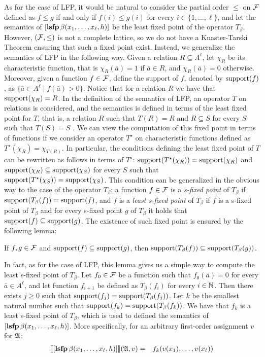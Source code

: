 As for the case of LFP, it would be natural to consider the partial order $\leq$ on $\F$ defined as $f \leq g$ if and only if $f(i) \leq g(i)$ for every $i \in \{1, \ldots, \ell\}$, and let the semantics of $[{\bf lsfp} \, \beta(x_1,\ldots,x_\ell,h)]$ be the least fixed point of the operator $T_\beta$. However, $(\F, \leq)$ is not a complete lattice, so we do not have a Knaster-Tarski Theorem ensuring that such a fixed point exist. Instead, we generalize the semantics of LFP in the following way. Given a relation $R \subseteq A^\ell$, let $\chi_R$ be its characteristic function, that is $\chi_R(\bar a) = 1$ if $\bar a \in R$, and $\chi_R(\bar a) = 0$ otherwise. Moreover, given a function $f \in \F$, define the support of $f$, denoted by $\text{\rm support}(f)$, as $\{ \bar a \in A^\ell \mid f(\bar a) > 0 \}$. Notice that for a relation $R$ we have that $\text{\rm support}(\chi_R) = R$. In the definition of the semantics of LFP, an operator $T$ on relations is considered, and the semantics is defined in terms of the least fixed point for $T$, that is, a relation $R$ such that $T(R) = R$ and $R \subseteq S$ for every $S$ such that $T(S) = S$ \cite{I86,vardi1982complexity}. We can view the computation of this fixed point in terms of functions if we consider an operator $T^\star$ on characteristic functions defined as $T^\star(\chi_R) = \chi_{T(R)}$. In particular, the conditions defining the least fixed point of $T$ can be rewritten as follows in terms of $T^\star$: $\text{\rm support}(T^\star(\chi_R)) = \text{\rm support}(\chi_R)$ and $\text{\rm support}(\chi_R) \subseteq \text{\rm support}(\chi_S)$ for every $S$ such that 
$\text{\rm support}(T^\star(\chi_{S})) = \text{\rm support}(\chi_S)$. This condition can be generalized in the obvious way to the case of the operator $T_\beta$: a function $f \in \F$ is a {\em s-fixed point} of $T_{\beta}$ if $\text{\rm support}(T_\beta(f)) = \text{\rm support}(f)$, and $f$ is a {\em least s-fixed point} of $T_{\beta}$ if $f$ is a s-fixed point of $T_\beta$ and for every s-fixed point $g$ of $T_\beta$ it holds that $\text{\rm support}(f) \subseteq \text{\rm support}(g)$. The existence of such fixed point is ensured by the following lemma:
\begin{lemma}\label{lem-support}
If $f,g \in \F$ and $\text{\rm support}(f) \subseteq \text{\rm support}(g)$, then $\text{\rm support}(T_\beta(f)) \subseteq \text{\rm support}(T_\beta(g))$.
\end{lemma}
In fact, as for the case of LFP, this lemma gives us a simple way to compute the least s-fixed point of $T_\beta$. Let $f_0 \in \F$ be a function such that $f_0(\bar a) = 0$ for every $\bar a \in A^\ell$, and let function $f_{i+1}$ be defined as $T_\beta(f_i)$ for every $i \in \mathbb{N}$. Then there exists $j \geq 0$ such that $\text{\rm support}(f_j) = \text{\rm support}(T_\beta(f_j))$. Let $k$ be the smallest natural number such that $\text{\rm support}(f_{k}) = \text{\rm support}(T_\beta(f_k))$. We have that $f_k$ is a least s-fixed point of $T_\beta$, which is used to defined the semantics of $[{\bf lsfp} \, \beta(x_1, \ldots, x_\ell, h)]$. More specifically, for an arbitrary first-order assignment $v$ for $\mathfrak{A}$:
\begin{eqnarray*}
{\llbracket{}{[{\bf lsfp} \, \beta(x_1, \ldots, x_\ell, h)]}\rrbracket}(\mathfrak{A},v) & = & f_{k}(v(x_1), \ldots, v(x_\ell))
\end{eqnarray*}

